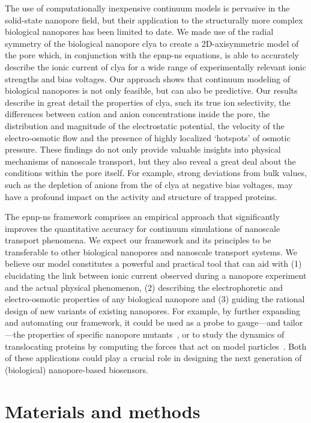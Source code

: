 The use of computationally inexpensive continuum models is pervasive in the solid-state nanopore field, but
their application to the structurally more complex biological nanopores has been limited to date. We made use
of the radial symmetry of the biological nanopore \gls{clya} to create a 2D-axisymmetric model of the pore
which, in conjunction with the \gls{epnp-ns} equations, is able to accurately describe the ionic current of
\gls{clya} for a wide range of experimentally relevant ionic strengths and bias voltages. Our approach shows
that continuum modeling of biological nanopores is not only feasible, but can also be predictive. Our results
describe in great detail the properties of \gls{clya}, such its true ion selectivity, the differences between
cation and anion concentrations inside the pore, the distribution and magnitude of the electrostatic
potential, the velocity of the electro-osmotic flow and the presence of highly localized `hotspots' of osmotic
pressure. These findings do not only provide valuable insights into physical mechanisms of nanoscale
transport, but they also reveal a great deal about the conditions within the pore itself. For example, strong
deviations from bulk values, such as the depletion of anions from the \lumen{} of \gls{clya} at negative bias
voltages, may have a profound impact on the activity and structure of trapped proteins.

The \gls{epnp-ns} framework comprises an empirical approach that significantly improves the quantitative
accuracy for continuum simulations of nanoscale transport phenomena. We expect our framework and its
principles to be transferable to other biological nanopores and nanoscale transport systems. We believe our
model constitutes a powerful and practical tool that can aid with (1) elucidating the link between ionic
current observed during a nanopore experiment and the actual physical phenomenon, (2) describing the
electrophoretic and electro-osmotic properties of any biological nanopore and (3) guiding the rational design
of new variants of existing nanopores. For example, by further expanding and automating our framework, it
could be used as a probe to gauge---and tailor---the properties of specific nanopore
mutants~\cite{Huang-2020,Cao-2019}, or to study the dynamics of translocating proteins by computing the forces
that act on model particles~\cite{Willems-Ruic-Biesemans-2019}. Both of these applications could play a
crucial role in designing the next generation of (biological) nanopore-based biosensors.


\section{Materials and methods}
%
\label{sec:transport:methods}
%
%

